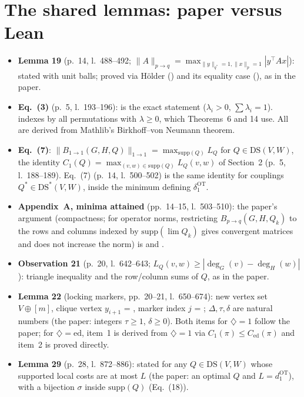 \section{The shared lemmas: paper versus Lean}
\begin{itemize}
\item \textbf{Lemma 19} (p.~14, l.~488--492; $\|A\|_{p\to q}=\max_{\|y\|_{q^*}=1,\|x\|_p=1}|y^\top Ax|$): stated with unit balls; proved via
  H\"older () and its equality case (), as in the paper.
\item \textbf{Eq.~(3)} (p.~5, l.~193--196):  is the exact statement ($\lambda_i>0$, $\sum\lambda_i=1$).
   indexes by all permutations with $\lambda\ge0$, which
  Theorems~6 and 14 use. All are derived from Mathlib's Birkhoff--von Neumann theorem.
\item \textbf{Eq.~(7)}: $\|B_{1\to1}(G,H,Q)\|_{1\to1}=\max_{\mathrm{supp}(Q)}L_Q$ for $Q\in\mathrm{DS}(V,W)$, the identity
  $C_1(Q)=\max_{(v,w)\in\mathrm{supp}(Q)}L_Q(v,w)$ of Section~2 (p.~5, l.~188--189). Eq.~(7) (p.~14, l.~500--502) is the same
  identity for couplings $Q^*\in\mathrm{DS}^*(V,W)$, inside the minimum defining $\delta^{\mathrm{OT}}_1$.
\item \textbf{Appendix~A, minima attained} (pp.~14--15, l.~503--510): the paper's argument (compactness; for operator norms, restricting
  $B_{p\to q}(G,H,Q_k)$ to the rows and columns indexed by $\mathrm{supp}(\lim Q_k)$ gives convergent matrices and does
  not increase the norm) is  and .
\item \textbf{Observation 21} (p.~20, l.~642--643; $L_Q(v,w)\ge|\deg_G(v)-\deg_H(w)|$): triangle inequality and the row/column sums of $Q$, as in the paper.
\item \textbf{Lemma 22} (locking markers, pp.~20--21, l.~650--674): new vertex set $V\oplus[m]$, clique vertex $y_{i+1}$ = , marker
  index $j$ = ; $\Delta,\tau,\delta$ are natural numbers (the paper: integers $\tau\ge1$, $\delta\ge0$). Both items
  for $\diamondsuit=1$ follow the paper; for $\diamondsuit=\mathrm{ed}$, item~1 is derived
  from $\diamondsuit=1$ via $C_1(\pi)\le C_{\mathrm{ed}}(\pi)$ and item~2 is proved directly.
\item \textbf{Lemma 29} (p.~28, l.~872--886): stated for any $Q\in\mathrm{DS}(V,W)$ whose supported local costs are at most $L$ (the paper: an
  optimal $Q$ and $L=d_1^{\mathrm{OT}}$), with a bijection $\sigma$ inside $\mathrm{supp}(Q)$ (Eq.~(18)).
\end{itemize}

